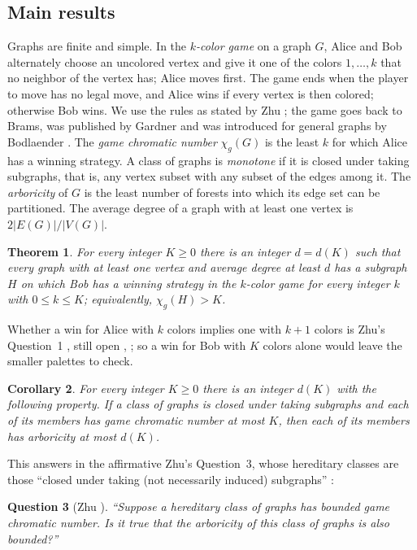 \documentclass[11pt]{article}
\newtheorem{theorem}{Theorem}[section]
\newtheorem{corollary}[theorem]{Corollary}
\newtheorem{question}[theorem]{Question}
\theoremstyle{remark}
\begin{document}
\subsection{Main results}
Graphs are finite and simple. In the \emph{$k$-color game} on a graph $G$,
Alice and Bob alternately choose an uncolored vertex and give it one of the
colors $1,\dots,k$ that no neighbor of the vertex has; Alice moves first.
The game ends when the player to move has no legal move, and Alice wins if
every vertex is then colored; otherwise Bob wins. We use the rules as
stated by Zhu \cite[pp.~1--2]{Zhu}; the game goes back to Brams, was
published by Gardner and was introduced for general graphs by Bodlaender
\cite[Section~1]{BGKZ}. The \emph{game chromatic number} $\chi_g(G)$ is the
least $k$ for which Alice has a winning strategy. A class of graphs is
\emph{monotone} if it is closed under taking subgraphs, that is, any vertex
subset with any subset of the edges among it. The
\emph{arboricity} of $G$ is the least number of forests into which its edge
set can be partitioned. The average degree of a graph with at least one
vertex is $2|E(G)|/|V(G)|$.

\begin{theorem}\label{thm:main}
For every integer $K\ge0$ there is an integer $d=d(K)$ such that every
graph with at least one vertex and average degree at least $d$ has a
subgraph $H$ on which Bob has a winning strategy in the $k$-color game for
every integer $k$ with $0\le k\le K$; equivalently, $\chi_g(H)>K$.
\end{theorem}

Whether a win for Alice with $k$ colors implies one with $k+1$ colors is
Zhu's Question~1 \cite[p.~11]{Zhu}, still open \cite[Section~8]{BGKZ},
\cite[Question~1.1]{Ho}; so a win for Bob with $K$ colors alone would leave
the smaller palettes to check.

\begin{corollary}\label{cor:arboricity}
For every integer $K\ge0$ there is an integer $d(K)$ with the following
property. If a class of graphs is closed under taking subgraphs and each of
its members has game chromatic number at most $K$, then each of its
members has arboricity at most $d(K)$.
\end{corollary}

This answers in the affirmative Zhu's Question~3, whose hereditary classes
are those ``closed under taking (not necessarily induced) subgraphs''
\cite[p.~12]{Zhu}:

\begin{question}[{Zhu \cite[Question 3]{Zhu}}]
``Suppose a hereditary class of graphs has bounded game chromatic number.
Is it true that the arboricity of this class of graphs is also bounded?''
\end{question}
\end{document}
